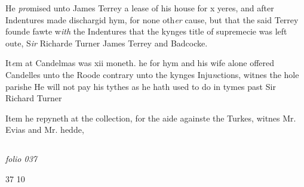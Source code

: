 \documentclass[12pt, a4paper]{book}
\begin{document}
            	
            	
            		
			
            		
		\ifthenelse{\isodd{\thepage}}
		{\reversemarginpar}
		{\normalmarginpar}
		He \textit{pro}mised unto James Terrey a lease of his house for x
            			yeres, and after Indentures made dischargid hym, for none oth\textit{er}
            			cause, but that the said Terrey founde fawte w\textit{ith} the Indentures
            			that the kynges title of supremecie was left oute, S\textit{ir} Richarde Turner
            			James Terrey and Badcocke.
            	
            	
            		
				\marginpar[\vspace{0.5cm}{\textcolor{Gray}{offerynge of candelles}}]{}
			
            		
		\ifthenelse{\isodd{\thepage}}
		{\reversemarginpar}
		{\normalmarginpar}
		It\textit{e}m at Candelmas was xii moneth. he for hym and his wife
            			alone offered Candelles unto the Roode contrary unto the
            			kynges Inju\textit{n}ctions, witnes the hole parishe
            			He will not pay his tythes as he hath used to do in tymes
            			past Sir Richard Turner
            		
		\ifthenelse{\isodd{\thepage}}
		{\reversemarginpar}
		{\normalmarginpar}
		Item he repyneth at the collection, for the aide againste
            			the Turkes, witnes Mr. Evias and Mr. hedde,
            	




            
\dotfill
						\newpage {} \subsection*{}  \subsection*{}

\textit{folio 037}


\begin{flushright}{\color{Mahogany}37} 10\end{flushright}
 
\end{document}
